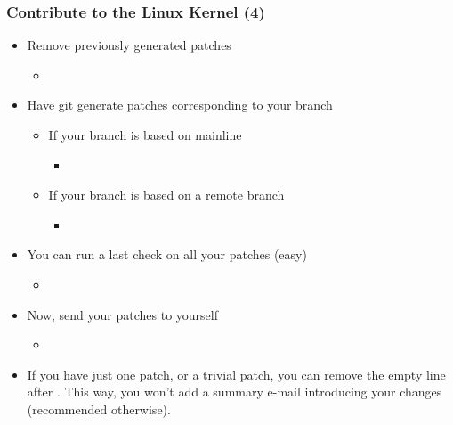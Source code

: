 \begin{frame}
  \frametitle{Contribute to the Linux Kernel (4)}
  \begin{itemize}
  \item Remove previously generated patches
    \begin{itemize}
    \item {}
    \end{itemize}
  \item Have git generate patches corresponding to your branch
    \begin{itemize}
    \item If your branch is based on mainline
      \begin{itemize}
      \item {}
      \end{itemize}
    \item If your branch is based on a remote branch
      \begin{itemize}
      \item {}
      \end{itemize}
    \end{itemize}
  \item You can run a last check on all your patches (easy)
    \begin{itemize}
    \item {}
    \end{itemize}
  \item Now, send your patches to yourself
    \begin{itemize}
    \item {}
    \end{itemize}
  \item If you have just one patch, or a trivial patch, you can remove
    the empty line after . This way, you won't add
    a summary e-mail introducing your changes (recommended otherwise).
  \end{itemize}
\end{frame}

